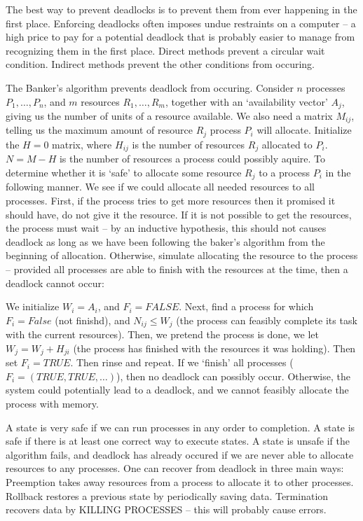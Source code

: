 The best way to prevent deadlocks is to prevent them from ever happening in the first place. Enforcing deadlocks often imposes undue restraints on a computer -- a high price to pay for a potential deadlock that is probably easier to manage from recognizing them in the first place. Direct methods prevent a circular wait condition. Indirect methods prevent the other conditions from occuring.

The Banker's algorithm prevents deadlock from occuring. Consider $n$ processes $P_1, \dots, P_n$, and $m$ resources $R_1, \dots, R_m$, together with an `availability vector' $A_j$, giving us the number of units of a resource available. We also need a matrix $M_{ij}$, telling us the maximum amount of resource $R_j$ process $P_i$ will allocate. Initialize the $H = 0$ matrix, where $H_{ij}$ is the number of resources $R_j$ allocated to $P_i$. $N = M - H$ is the number of resources a process could possibly aquire. To determine whether it is `safe' to allocate some resource $R_j$ to a process $P_i$ in the following manner. We see if we could allocate all needed resources to all processes. First, if the process tries to get more resources then it promised it should have, do not give it the resource. If it is not possible to get the resources, the process must wait -- by an inductive hypothesis, this should not causes deadlock as long as we have been following the baker's algorithm from the beginning of allocation. Otherwise, simulate allocating the resource to the process -- provided all processes are able to finish with the resources at the time, then a deadlock cannot occur:

We initialize $W_i = A_i$, and $F_i = FALSE$. Next, find a process for which $F_i = False$ (not finishd), and $N_{ij} \leq W_j$ (the process can feasibly complete its task with the current resources). Then, we pretend the process is done, we let $W_j = W_j + H_{ji}$ (the process has finished with the resources it was holding). Then set $F_i = TRUE$. Then rinse and repeat. If we `finish' all processes ($F_i = (TRUE, TRUE, \dots)$), then no deadlock can possibly occur. Otherwise, the system could potentially lead to a deadlock, and we cannot feasibly allocate the process with memory.

A state is very safe if we can run processes in any order to completion. A state is safe if there is at least one correct way to execute states. A state is unsafe if the algorithm fails, and deadlock has already occured if we are never able to allocate resources to any processes. One can recover from deadlock in three main ways: Preemption takes away resources from a process to allocate it to other processes. Rollback restores a previous state by periodically saving data. Termination recovers data by KILLING PROCESSES -- this will probably cause errors.


